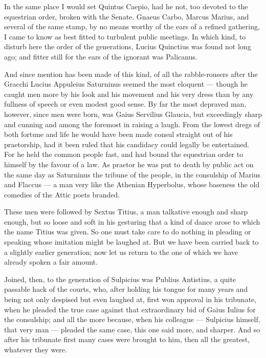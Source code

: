  In the same place I would set Quintus Caepio, had he not, too devoted to the equestrian order, broken with the Senate. Gnaeus Carbo, Marcus Marius, and several of the same stamp, by no means worthy of the ears of a refined gathering, I came to know as best fitted to turbulent public meetings. In which kind, to disturb here the order of the generations, Lucius Quinctius was found not long ago; and fitter still for the ears of the ignorant was Palicanus.

 And since mention has been made of this kind, of all the rabble-rousers after the Gracchi Lucius Appuleius Saturninus seemed the most eloquent — though he caught men more by his look and his movement and his very dress than by any fullness of speech or even modest good sense. By far the most depraved man, however, since men were born, was Gaius Servilius Glaucia, but exceedingly sharp and cunning and among the foremost in raising a laugh. From the lowest dregs of both fortune and life he would have been made consul straight out of his praetorship, had it been ruled that his candidacy could legally be entertained. For he held the common people fast, and had bound the equestrian order to himself by the favour of a law. As praetor he was put to death by public act on the same day as Saturninus the tribune of the people, in the consulship of Marius and Flaccus — a man very like the Athenian Hyperbolus, whose baseness the old comedies of the Attic poets branded.

 These men were followed by Sextus Titius, a man talkative enough and sharp enough, but so loose and soft in his gesturing that a kind of dance arose to which the name Titius was given. So one must take care to do nothing in pleading or speaking whose imitation might be laughed at. But we have been carried back to a slightly earlier generation; now let us return to the one of which we have already spoken a fair amount.

 Joined, then, to the generation of Sulpicius was Publius Antistius, a quite passable hack of the courts, who, after holding his tongue for many years and being not only despised but even laughed at, first won approval in his tribunate, when he pleaded the true case against that extraordinary bid of Gaius Iulius for the consulship; and all the more because, when his colleague — Sulpicius himself, that very man — pleaded the same case, this one said more, and sharper. And so after his tribunate first many cases were brought to him, then all the greatest, whatever they were.

